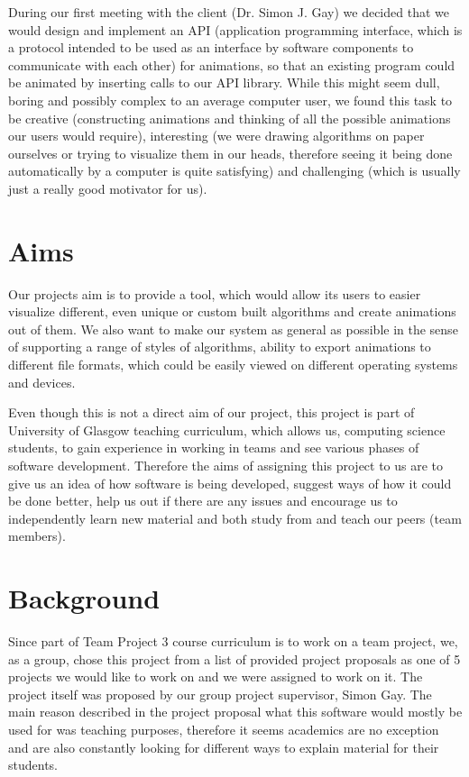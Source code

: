 \documentclass{l3proj}
\begin{document}
During our first meeting with the client (Dr. Simon J. Gay) we decided that we would design and implement an API (application programming interface, which is a protocol intended to be used as an interface by software components to communicate with each other) for animations, so that an existing program could be animated by inserting calls to our API library. While this might seem dull, boring and possibly complex to an average computer user, we found this task to be creative (constructing animations and thinking of all the possible animations our users would require), interesting (we were drawing algorithms on paper ourselves or trying to visualize them in our heads, therefore seeing it being done automatically by a computer is quite satisfying) and challenging (which is usually just a really good motivator for us).
\section{Aims}
Our projects aim is to provide a tool, which would allow its users to easier visualize different, even unique or custom built algorithms and create animations out of them. We also want to make our system as general as possible in the sense of supporting a range of styles of algorithms, ability to export animations to different file formats, which could be easily viewed on different operating systems and devices.

Even though this is not a direct aim of our project, this project is part of University of Glasgow teaching curriculum, which allows us, computing science students, to gain experience in working in teams and see various phases of software development. Therefore the aims of assigning this project to us are to give us an idea of how software is being developed, suggest ways of how it could be done better, help us out if there are any issues and encourage us to independently learn new material and both study from and teach our peers (team members).

\section{Background}
Since part of Team Project 3 course curriculum is to work on a team project, we, as a group, chose this project from a list of provided project proposals as one of 5 projects we would like to work on and we were assigned to work on it. The project itself was proposed by our group project supervisor, Simon Gay. The main reason described in the project proposal what this software would mostly be used for was teaching purposes, therefore it seems academics are no exception and are also constantly looking for different ways to explain material for their students.
\end{document}
